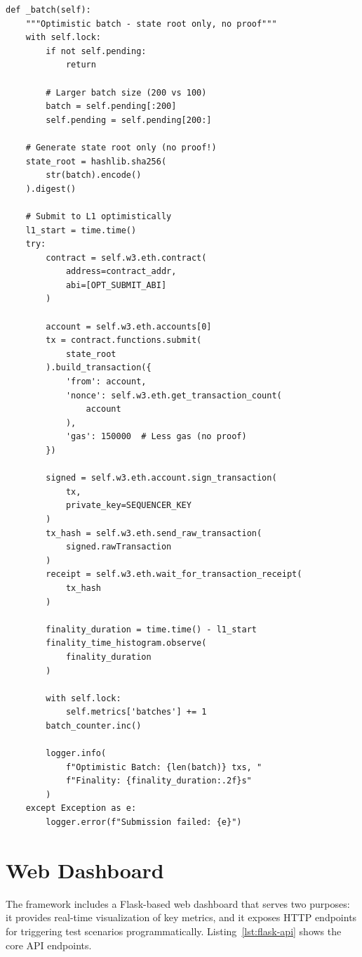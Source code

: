\documentclass[
]{elteikthesis}[2024/04/26]
\begin{document}
\begin{listing}[H]
    \begin{verbatim}
def _batch(self):
    """Optimistic batch - state root only, no proof"""
    with self.lock:
        if not self.pending:
            return
        
        # Larger batch size (200 vs 100)
        batch = self.pending[:200]
        self.pending = self.pending[200:]
    
    # Generate state root only (no proof!)
    state_root = hashlib.sha256(
        str(batch).encode()
    ).digest()
    
    # Submit to L1 optimistically
    l1_start = time.time()
    try:
        contract = self.w3.eth.contract(
            address=contract_addr,
            abi=[OPT_SUBMIT_ABI]
        )
        
        account = self.w3.eth.accounts[0]
        tx = contract.functions.submit(
            state_root
        ).build_transaction({
            'from': account,
            'nonce': self.w3.eth.get_transaction_count(
                account
            ),
            'gas': 150000  # Less gas (no proof)
        })
        
        signed = self.w3.eth.account.sign_transaction(
            tx, 
            private_key=SEQUENCER_KEY
        )
        tx_hash = self.w3.eth.send_raw_transaction(
            signed.rawTransaction
        )
        receipt = self.w3.eth.wait_for_transaction_receipt(
            tx_hash
        )
        
        finality_duration = time.time() - l1_start
        finality_time_histogram.observe(
            finality_duration
        )
        
        with self.lock:
            self.metrics['batches'] += 1
        batch_counter.inc()
        
        logger.info(
            f"Optimistic Batch: {len(batch)} txs, "
            f"Finality: {finality_duration:.2f}s"
        )
    except Exception as e:
        logger.error(f"Submission failed: {e}")
    \end{verbatim}
    \caption{Optimistic rollup sequencer differences}
    \label{lst:opt-sequencer}
\end{listing}

\section{Web Dashboard}

The framework includes a Flask-based web dashboard that serves two purposes: it provides real-time visualization of key metrics, and it exposes HTTP endpoints for triggering test scenarios programmatically. Listing~\ref{lst:flask-api} shows the core API endpoints.
\end{document}
